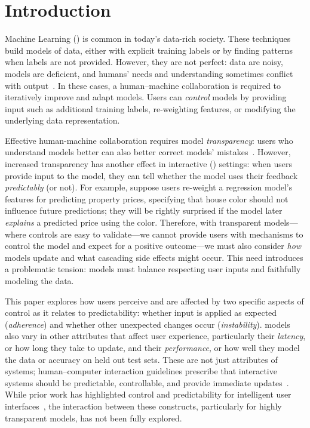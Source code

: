 \section{Introduction}

Machine Learning () is common in today's data-rich society.
These techniques build models of data, either with explicit training
labels or by finding patterns when labels are not provided.
However, they are not perfect: data are noisy, models are
deficient, and humans' needs and understanding sometimes conflict with
 output~\cite{amodei2016concrete}.
In these cases, a human--machine collaboration is required to iteratively improve and adapt models.
Users can \textit{control} models by providing input such as additional training labels, re-weighting features, or modifying the underlying data representation.


Effective human-machine collaboration requires model
\textit{transparency}: users who understand models better can also
better correct models'
mistakes~\cite{Kulesza2010ExplanatoryPrograms,
  Rosenthal2010TowardsData}.
However, increased transparency has another effect in interactive 
() settings: when users provide input to the model, they can tell whether the model uses their feedback
\textit{predictably} (or not).
For example, suppose users re-weight a regression model's features
for predicting property prices, specifying that house color should
not influence future predictions; they will be rightly
surprised if the model later \textit{explains} a predicted price using
the color.
Therefore, with transparent models---where controls are easy to validate---we cannot  provide
users with mechanisms to control the model and expect for a positive
outcome---we must also consider \textit{how} models update and what
cascading side effects might occur. This need introduces a problematic
tension:
 models must balance respecting user inputs and faithfully modeling
 the data.

This paper explores how users perceive and are affected by two specific aspects of control as it relates to predictability: whether input is applied as expected (\textit{adherence}) and whether other unexpected changes occur (\textit{instability}).  models also vary in other attributes that affect user experience, particularly their \textit{latency}, or how long they take to update, and their \textit{performance}, or how well they model the data or accuracy on held out test sets. These are not just attributes of  systems; human--computer interaction guidelines prescribe that interactive systems should be predictable, controllable, and provide immediate updates~\cite{Hoekman2007DesigningDesign, Shneiderman1996TheVisualizations}. While prior work has highlighted control and predictability for intelligent user interfaces~\cite{Hook2000StepsReal}, the interaction between these constructs, particularly for highly transparent models, has not been fully explored.

